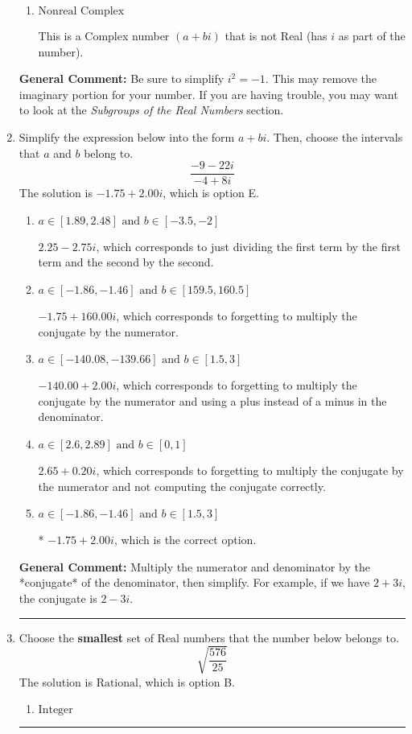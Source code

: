 \documentclass{extbook}[14pt]
\newcommand{\litem}[1]{\item #1

\rule{\textwidth}{0.4pt}}
\begin{document}
\begin{enumerate}
{\begin{enumerate}[label=\Alph*.]
These are numbers that can be written as fraction of Integers (e.g., -2/3 + 5)
\item \( \text{Nonreal Complex} \)

This is a Complex number $(a+bi)$ that is not Real (has $i$ as part of the number).
\end{enumerate}

\textbf{General Comment:} Be sure to simplify $i^2 = -1$. This may remove the imaginary portion for your number. If you are having trouble, you may want to look at the \textit{Subgroups of the Real Numbers} section.
}
\litem{
Simplify the expression below into the form $a+bi$. Then, choose the intervals that $a$ and $b$ belong to.
\[ \frac{-9 - 22 i}{-4 + 8 i} \]
The solution is \( -1.75  + 2.00 i \), which is option E.\begin{enumerate}[label=\Alph*.]
\item \( a \in [1.89, 2.48] \text{ and } b \in [-3.5, -2] \)

 $2.25  - 2.75 i$, which corresponds to just dividing the first term by the first term and the second by the second.
\item \( a \in [-1.86, -1.46] \text{ and } b \in [159.5, 160.5] \)

 $-1.75  + 160.00 i$, which corresponds to forgetting to multiply the conjugate by the numerator.
\item \( a \in [-140.08, -139.66] \text{ and } b \in [1.5, 3] \)

 $-140.00  + 2.00 i$, which corresponds to forgetting to multiply the conjugate by the numerator and using a plus instead of a minus in the denominator.
\item \( a \in [2.6, 2.89] \text{ and } b \in [0, 1] \)

 $2.65  + 0.20 i$, which corresponds to forgetting to multiply the conjugate by the numerator and not computing the conjugate correctly.
\item \( a \in [-1.86, -1.46] \text{ and } b \in [1.5, 3] \)

* $-1.75  + 2.00 i$, which is the correct option.
\end{enumerate}

\textbf{General Comment:} Multiply the numerator and denominator by the *conjugate* of the denominator, then simplify. For example, if we have $2+3i$, the conjugate is $2-3i$.
}
\litem{
Choose the \textbf{smallest} set of Real numbers that the number below belongs to.
\[ \sqrt{\frac{576}{25}} \]
The solution is \( \text{Rational} \), which is option B.\begin{enumerate}[label=\Alph*.]
\item \( \text{Integer} \)


\end{enumerate}}
\end{enumerate}
\end{document}
